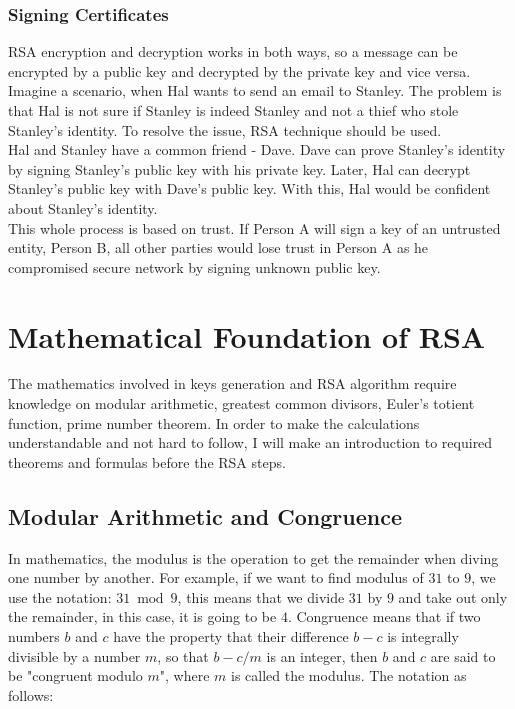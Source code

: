 \documentclass[a4paper, 12pt]{article}
\begin{document}
\subsubsection{Signing Certificates}
\label{bbsec:signing}

RSA encryption and decryption works in both ways, so a
message can be encrypted by a public key and decrypted by the private key and vice versa.\\

Imagine a scenario, when Hal wants to send an email to Stanley. The problem is that Hal is not sure
if Stanley is indeed Stanley and not a thief who stole Stanley's identity. To resolve the issue, RSA
technique should be used. \\

Hal and Stanley have a common friend - Dave. Dave can prove Stanley's identity by signing Stanley's
public key with his private key. Later, Hal can decrypt Stanley's public key with Dave's public key.
With this, Hal would be confident about Stanley's identity.\\

This whole process is based on trust. If Person A will sign a key of an untrusted entity, Person B, all other parties
would lose trust in Person A as he compromised secure network by signing unknown public key.\\

\section{Mathematical Foundation of RSA}
\label{sec:math}

The mathematics involved in keys generation and RSA algorithm require knowledge on modular
arithmetic, greatest common divisors, Euler's totient function, prime number theorem. In order to
make the calculations understandable and not hard to follow, I will make an introduction to
required theorems and formulas before the RSA steps.\\

\subsection{Modular Arithmetic and Congruence}
\label{bsec:mod}

In mathematics, the modulus is the operation to get the remainder when diving one number by
another. For example, if we want to find modulus of $31$ to $9$, we use the notation: $31\bmod9$, this
means that we divide $31$ by $9$ and take out only the remainder, in this case, it is going to be $4$.
Congruence means that if two numbers $b$ and $c$ have the property that their difference $b - c$ is
integrally divisible by a number $m$, so that $b - c/m$ is an integer, then $b$ and $c$ are said to be
"congruent modulo $m$", where $m$ is called the modulus. The notation as follows:
\end{document}
